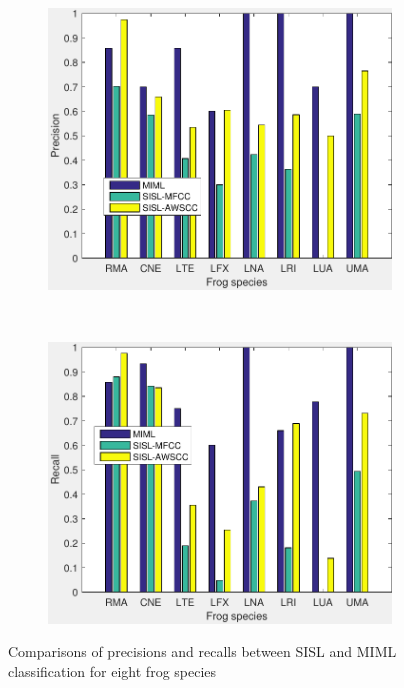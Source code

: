 \begin{figure}[htb!]
\centering
        \begin{subfigure}[b]{0.48\textwidth}
                \includegraphics[width=\textwidth]{image/Ch6/Precision_MIML_SISL_2.pdf}
        \end{subfigure}
       ~
              \begin{subfigure}[b]{0.48\textwidth}
                \includegraphics[width=\textwidth]{image/Ch6/Recall_MIML_SISL_2.pdf}                
        \end{subfigure}     
\caption[Comparisons between SISL and MIML]{Comparisons of precisions and recalls between SISL and MIML classification for eight frog species}
        \label{fig:comparisonofSISLandMIML}
\end{figure}




